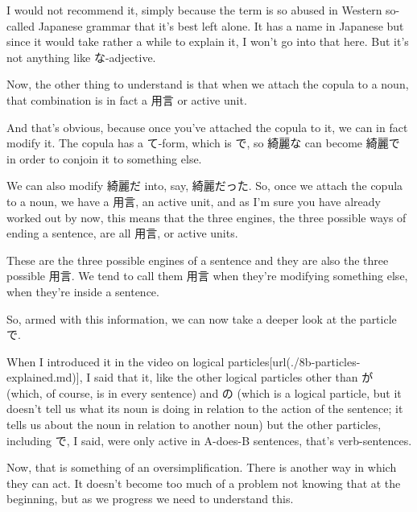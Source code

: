 I would not recommend it, simply because the term is so abused in Western so-called Japanese grammar that it's best left alone. It has a name in Japanese but since it would take rather a while to explain it, I won't go into that here. But it's not anything like な-adjective.

\thinrule

Now, the other thing to understand is that when we attach the copula to a noun, that combination is in fact a 用言 or active unit.

{}

And that's obvious, because once you've attached the copula to it, we can in fact modify it. The copula has a て-form, which is で, so 綺麗な can become 綺麗で in order to conjoin it to something else.

We can also modify 綺麗だ into, say, 綺麗だった. So, once we attach the copula to a noun, we have a 用言, an active unit, and as I'm sure you have already worked out by now, this means that the three engines, the three possible ways of ending a sentence, are all 用言, or active units.

{}

These are the three possible engines of a sentence and they are also the three possible 用言. We tend to call them 用言 when they're modifying something else, when they're inside a sentence.

So, armed with this information, we can now take a deeper look at the particle で.

\stopsectionlevel

\startsectionlevel[title={A deeper look into the particle で},reference={a-deeper-look-into-the-particle-で}]

When I introduced it in the video on logical particles\goto{{[}8b{]}}[url(./8b-particles-explained.md)], I said that it, like the other logical particles other than が (which, of course, is in every sentence) and の (which is a logical particle, but it doesn't tell us what its noun is doing in relation to the action of the sentence; it tells us about the noun in relation to another noun) but the other particles, including で, I said, were only active in A-does-B sentences, that's verb-sentences.

Now, that is something of an oversimplification. There is another way in which they can act. It doesn't become too much of a problem not knowing that at the beginning, but as we progress we need to understand this.

